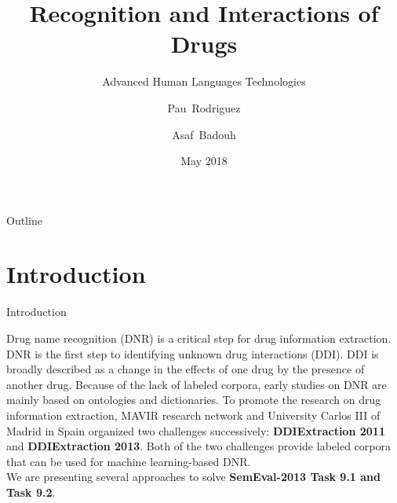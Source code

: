 \documentclass[xcolor=table]{beamer}
\title{Recognition and Interactions of Drugs}
\subtitle{Advanced Human Languages Technologies}
\author{Pau~Rodriguez \and Asaf~Badouh}
\institute[]
{
  Universitat Politecnica de Catalunya\\
  MIRI - Data Science
  }
\date{May 2018}
\begin{document}
\begin{frame}
  \titlepage
\end{frame}

\begin{frame}{Outline}
  \tableofcontents
\end{frame}


\section{Introduction}
\begin{frame}{Introduction}

Drug name recognition (DNR) is a critical step for drug information extraction.
DNR is the first step to identifying unknown drug interactions (DDI).
DDI is broadly described as a change in the effects of one drug by the presence of another drug.
Because of the lack of labeled corpora, early studies on DNR are mainly based on ontologies and dictionaries.
To promote the research on drug information extraction, MAVIR research network and University Carlos III of Madrid in Spain organized two challenges successively: \textbf{DDIExtraction 2011} and \textbf{DDIExtraction 2013}. 
Both of the two challenges provide labeled corpora that can be used for machine learning-based DNR.\\
We are presenting several approaches to solve \textbf{SemEval-2013 Task 9.1 and Task 9.2}. 
\end{frame}



    
\end{document}
